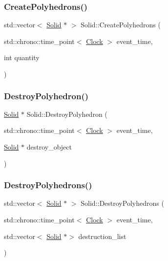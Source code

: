 \mbox{\label{classSolid_a40b2ea07e384aff138ba139c3c84f525}} 
\subsubsection{\texorpdfstring{Create\+Polyhedrons()}{CreatePolyhedrons()}}
{\footnotesize\ttfamily std\+::vector$<$ \mbox{\hyperlink{classSolid}{Solid}} $\ast$ $>$ Solid\+::\+Create\+Polyhedrons (\begin{DoxyParamCaption}\item[{std\+::chrono\+::time\+\_\+point$<$ \mbox{\hyperlink{universe_8h_a0ef8d951d1ca5ab3cfaf7ab4c7a6fd80}{Clock}} $>$}]{event\+\_\+time,  }\item[{int}]{quantity }\end{DoxyParamCaption})}

\mbox{\label{classSolid_a0841900d8ef4b82292ac027c4852b59b}} 
\subsubsection{\texorpdfstring{Destroy\+Polyhedron()}{DestroyPolyhedron()}}
{\footnotesize\ttfamily \mbox{\hyperlink{classSolid}{Solid}} $\ast$ Solid\+::\+Destroy\+Polyhedron (\begin{DoxyParamCaption}\item[{std\+::chrono\+::time\+\_\+point$<$ \mbox{\hyperlink{universe_8h_a0ef8d951d1ca5ab3cfaf7ab4c7a6fd80}{Clock}} $>$}]{event\+\_\+time,  }\item[{\mbox{\hyperlink{classSolid}{Solid}} $\ast$}]{destroy\+\_\+object }\end{DoxyParamCaption})}

\mbox{\label{classSolid_ab1652ee511ed51bbe6a0a3b1854b7974}} 
\subsubsection{\texorpdfstring{Destroy\+Polyhedrons()}{DestroyPolyhedrons()}}
{\footnotesize\ttfamily std\+::vector$<$ \mbox{\hyperlink{classSolid}{Solid}} $\ast$ $>$ Solid\+::\+Destroy\+Polyhedrons (\begin{DoxyParamCaption}\item[{std\+::chrono\+::time\+\_\+point$<$ \mbox{\hyperlink{universe_8h_a0ef8d951d1ca5ab3cfaf7ab4c7a6fd80}{Clock}} $>$}]{event\+\_\+time,  }\item[{std\+::vector$<$ \mbox{\hyperlink{classSolid}{Solid}} $\ast$$>$}]{destruction\+\_\+list }\end{DoxyParamCaption})}

